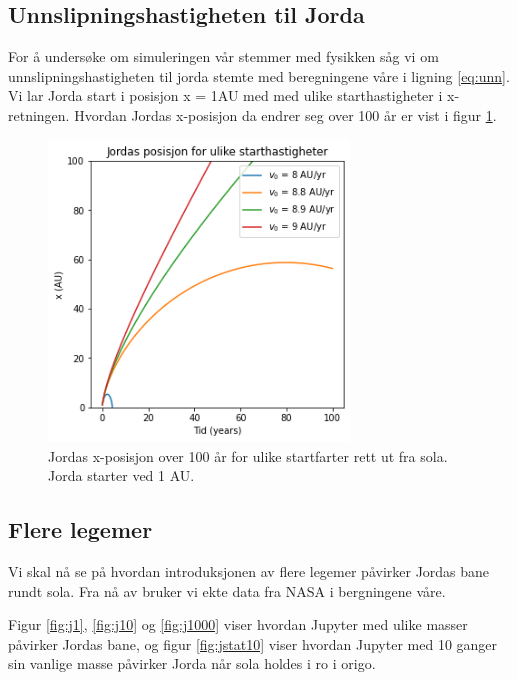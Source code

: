 \documentclass[reprint,english,notitlepage]{revtex4-1}
\begin{document}
\subsection{Unnslipningshastigheten til Jorda}
	For å undersøke om simuleringen vår stemmer med fysikken såg vi om unnslipningshastigheten til jorda stemte med beregningene våre i ligning \ref{eq:unn}. Vi lar Jorda start i posisjon x = 1AU med med ulike starthastigheter i x-retningen. Hvordan Jordas x-posisjon da endrer seg over 100 år er vist i figur \ref{fig:escape}.

	\begin{figure}[H]
		\includegraphics[width=80mm]{../../Code/Figures/escape.png}
		\caption{Jordas x-posisjon over 100 år for ulike startfarter rett ut fra sola. Jorda starter ved 1 AU.}
		\label{fig:escape}
	\end{figure}

\subsection{Flere legemer}
	Vi skal nå se på hvordan introduksjonen av flere legemer påvirker Jordas bane rundt sola. Fra nå av bruker vi ekte data fra NASA\cite{NASA} i bergningene våre.
	
	Figur \ref{fig:j1}, \ref{fig:j10} og \ref{fig:j1000} viser hvordan Jupyter med ulike masser påvirker Jordas bane, og figur \ref{fig:jstat10} viser hvordan Jupyter med 10 ganger sin vanlige masse påvirker Jorda når sola holdes i ro i origo.
\end{document}
